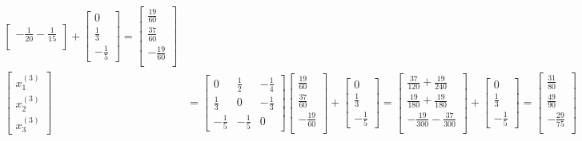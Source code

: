 \begin{align}
\begin{bmatrix}
				-\frac{1}{20} - \frac{1}{15} \\
			\end{bmatrix}
			+
			\begin{bmatrix}
				0 \\
				\frac{1}{3} \\
				-\frac{1}{5}
			\end{bmatrix}
			=
			\begin{bmatrix}
				\frac{19}{60} \\
				\frac{37}{60} \\
				-\frac{19}{60} \\
			\end{bmatrix}
			& \\
			\begin{bmatrix}
				x_{1}^{(3)} \\
				x_{2}^{(3)} \\
				x_{3}^{(3)}
			\end{bmatrix}
			&=
			\begin{bmatrix}
				0 & \frac{1}{2} & -\frac{1}{4} \\
				\frac{1}{3} & 0 & -\frac{1}{3} \\
				-\frac{1}{5} & -\frac{1}{5} & 0
			\end{bmatrix}
			\begin{bmatrix}
				\frac{19}{60} \\
				\frac{37}{60} \\
				-\frac{19}{60} \\
			\end{bmatrix}
			+
			\begin{bmatrix}
				0 \\
				\frac{1}{3} \\
				-\frac{1}{5}
			\end{bmatrix} =
			\begin{bmatrix}
				\frac{37}{120} + \frac{19}{240} \\
				\frac{19}{180} + \frac{19}{180} \\
				-\frac{19}{300} - \frac{37}{300} \\
			\end{bmatrix}
			+
			\begin{bmatrix}
				0 \\
				\frac{1}{3} \\
				-\frac{1}{5}
			\end{bmatrix}
			=
			\begin{bmatrix}
				\frac{31}{80} \\
				\frac{49}{90} \\
				-\frac{29}{75} \\
			\end{bmatrix}&
		\end{align}

